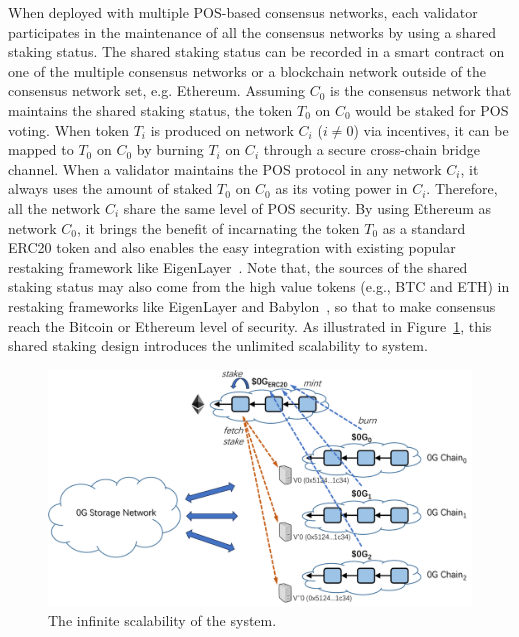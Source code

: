 When deployed with multiple POS-based consensus networks, each validator participates in the maintenance of all the consensus networks by using a shared staking status.
The shared staking status can be recorded in a smart contract on one of the multiple consensus networks or a blockchain network outside of the \projabbrev consensus network set, e.g. Ethereum. 
Assuming $C_0$ is the consensus network that maintains the shared staking status, the token $T_0$ on $C_0$ would be staked for POS voting.  
When token $T_i$ is produced on network $C_i$ ($i \neq 0$) via incentives, it can be mapped to $T_0$ on $C_0$ by burning $T_i$ on $C_i$ through a secure cross-chain bridge channel.
When a validator maintains the POS protocol in any network $C_i$, it always uses the amount of staked $T_0$ on $C_0$ as its voting power in $C_i$. 
Therefore, all the network $C_i$ share the same level of POS security. 
By using Ethereum as network $C_0$, it brings the benefit of incarnating the token $T_0$ as a standard ERC20 token and also enables the easy integration with existing popular restaking framework like EigenLayer~\cite{eigenlayer}.
Note that, the sources of the shared staking status may also come from the high value tokens (e.g., BTC and ETH) in restaking frameworks like EigenLayer and Babylon~\cite{babylon}, so that to make \projabbrev consensus reach the Bitcoin or Ethereum level of security.  
As illustrated in Figure~\ref{fig:scale}, this shared staking design introduces the unlimited scalability to \projabbrev system.

\begin{figure}[H]	
	\includegraphics[width=\textwidth]{figure/scale.pdf}
	\caption{The infinite scalability of the \projabbrev system.}
	\label{fig:scale}
\end{figure}


